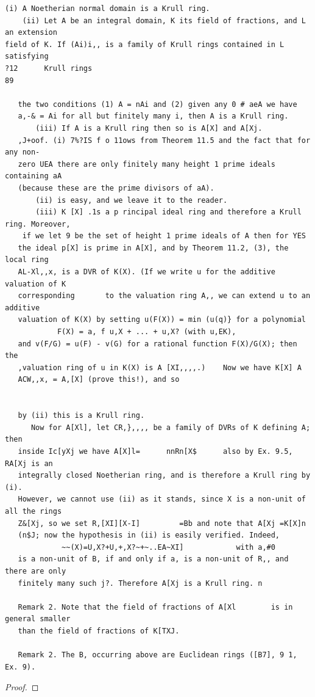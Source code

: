 \begin{theorem}\label{mcrt-auto-theorem-12-4}\uses{}
\begin{verbatim}
(i) A Noetherian normal domain is a Krull ring.
    (ii) Let A be an integral domain, K its field of fractions, and L an extension
field of K. If (Ai)i,, is a family of Krull rings contained in L satisfying
?12      Krull rings                                                           89

   the two conditions (1) A = nAi and (2) given any 0 # aeA we have
   a,-& = Ai for all but finitely many i, then A is a Krull ring.
       (iii) If A is a Krull ring then so is A[X] and A[Xj.
   ,J+oof. (i) 7%?IS f o 11ows from Theorem 11.5 and the fact that for any non-
   zero UEA there are only finitely many height 1 prime ideals containing aA
   (because these are the prime divisors of aA).
       (ii) is easy, and we leave it to the reader.
       (iii) K [X] .1s a p rincipal ideal ring and therefore a Krull ring. Moreover,
    if we let 9 be the set of height 1 prime ideals of A then for YES
   the ideal p[X] is prime in A[X], and by Theorem 11.2, (3), the local ring
   AL-Xl,,x, is a DVR of K(X). (If we write u for the additive valuation of K
   corresponding       to the valuation ring A,, we can extend u to an additive
   valuation of K(X) by setting u(F(X)) = min (u(q)} for a polynomial
            F(X) = a, f u,X + ... + u,X? (with u,EK),
   and v(F/G) = u(F) - v(G) for a rational function F(X)/G(X); then the
   ,valuation ring of u in K(X) is A [XI,,,,.)    Now we have K[X] A
   ACW,,x, = A,[X] (prove this!), and so


   by (ii) this is a Krull ring.
      Now for A[Xl], let CR,},,,, be a family of DVRs of K defining A; then
   inside Ic[yXj we have A[X]l=      nnRn[X$      also by Ex. 9.5, RA[Xj is an
   integrally closed Noetherian ring, and is therefore a Krull ring by (i).
   However, we cannot use (ii) as it stands, since X is a non-unit of all the rings
   Z&[Xj, so we set R,[XI][X-I]         =Bb and note that A[Xj =K[X]n
   (n$J; now the hypothesis in (ii) is easily verified. Indeed,
             ~~(X)=U,X?+U,+,X?~+~..EA~XI]            with a,#0
   is a non-unit of B, if and only if a, is a non-unit of R,, and there are only
   finitely many such j?. Therefore A[Xj is a Krull ring. n

   Remark 2. Note that the field of fractions of A[Xl        is in general smaller
   than the field of fractions of K[TXJ.

   Remark 2. The B, occurring above are Euclidean rings ([B7], 9 1, Ex. 9).
\end{verbatim}
\end{theorem}
\begin{proof}
\notready
\end{proof}


